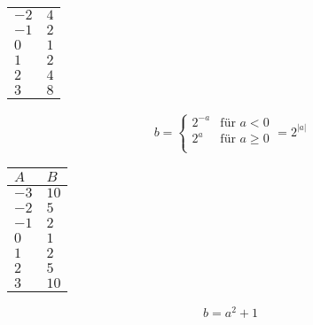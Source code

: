 \begin{itemize}[leftmargin=*]
\begin{enumerate}
\begin{minipage}[t][8cm][t]{0.5\columnwidth}
\begin{tabular}{P{3cm}|P{3cm}}
                                        $-2$ & $4$ \\
                                        $-1$ & $2$ \\
                                        $0$ & $1$ \\
                                        $1$ & $2$ \\
                                        $2$ & $4$ \\
                                        $3$ & $8$ \\
                                    \end{tabular}
                                    \begin{equation*}
                                        b = \begin{cases}
                                            2^{-a} & \text{für } a < 0 \\
                                            2^a    & \text{für } a \geq 0 \\ 
                                        \end{cases} = 2^{|a|}
                                    \end{equation*}
                                \end{minipage}
                                \begin{minipage}[t][8cm][t]{0.5\columnwidth}
                                    \begin{tabular}{P{3cm}|P{3cm}}
                                        $A$         & $B$       \\\hline
                                        $-3$ & $10$ \\
                                        $-2$ & $5$ \\
                                        $-1$ & $2$ \\
                                        $0$ & $1$ \\
                                        $1$ & $2$ \\
                                        $2$ & $5$ \\
                                        $3$ & $10$ \\
                                    \end{tabular}
                                    \begin{equation*}
                                        b = a^2 + 1  
                                    \end{equation*}

\end{minipage}
\end{enumerate}
\end{itemize}
